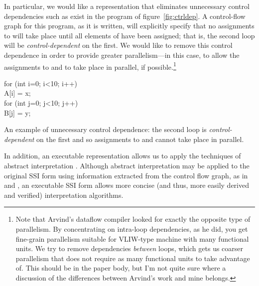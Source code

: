 \documentclass[12pt,titlepage,twoside]{article}
\begin{document}
In particular, we would like a representation that eliminates
unnecessary control dependencies such as exist in the program of
figure~\vref{fig:ctrldep}.  A control-flow graph for this program, as
it is written, will explicitly specify that no assignments to
 will take place until all elements of  have
been assigned; that is, the second loop will be
\emph{control-dependent} on the first.  We would like to remove this
control dependence in order to provide greater parallelism---in this
case, to allow the assignments to  and  to
take place in parallel, if possible.\footnote{Note that Arvind's
dataflow compiler \cite{traub86:ttda} looked for exactly the opposite type of
parallelism.  By concentrating on intra-loop dependencies, as he did, you get
fine-grain parallelism suitable for VLIW-type machine with many
functional units.  We try to remove dependencies \emph{between} loops,
which gets us coarser parallelism that does not require as many
functional units to take advantage of.  This should be in the paper
body, but I'm not quite sure where a discussion of the differences
between Arvind's work and mine belongs.}

\begin{myfigure}[t]
\begin{samplecode}
for (int i=0; i<10; i++)\\
\>A[i] = x;\\
for (int j=0; j<10; j++)\\
\>B[j] = y;\\
\end{samplecode}
\caption[An example of unnecessary control dependence.]
{An example of unnecessary control dependence: the second loop
is \emph{control-dependent} on the first and so assignments to
 and  cannot take place in parallel.}
\label{fig:ctrldep}
\end{myfigure}

In addition, an executable representation allows us to apply the
techniques of abstract interpretation \cite{idunno}.  Although abstract
interpretation may be applied to the original SSI form using
information extracted from the control flow graph, as in \cite{foo}
and \cite{bar}, an executable SSI form allows more concise (and thus,
more easily derived and verified) interpretation
algorithms.
\end{document}
